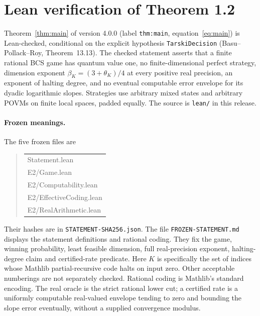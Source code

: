 \section{Lean verification of Theorem 1.2}\label{sec:lean}
Theorem~\ref{thm:main} of version 4.0.0 (label \texttt{thm:main}, equation~\eqref{eq:main}) is Lean-checked, conditional on the explicit hypothesis \texttt{TarskiDecision} (Basu--Pollack--Roy, Theorem~13.13). The checked statement asserts that a finite rational BCS game has quantum value one, no finite-dimensional perfect strategy, dimension exponent $\beta_K=(3+\theta_K)/4$ at every positive real precision, an exponent of halting degree, and no eventual computable error envelope for its dyadic logarithmic slopes. Strategies use arbitrary mixed states and arbitrary POVMs on finite local spaces, padded equally. The source is \texttt{lean/} in this release.

\paragraph{Frozen meanings.}
The five frozen files are
\begin{quote}\ttfamily
\begin{tabular}{@{}l@{}}
Statement.lean\\
E2/Game.lean\\
E2/Computability.lean\\
E2/EffectiveCoding.lean\\
E2/RealArithmetic.lean
\end{tabular}
\end{quote}
Their hashes are in \texttt{STATEMENT-SHA256.json}. The file \texttt{FROZEN-STATEMENT.md} displays the statement definitions and rational coding. They fix the game, winning probability, least feasible dimension, full real-precision exponent, halting-degree claim and certified-rate predicate. Here $K$ is specifically the set of indices whose Mathlib partial-recursive code halts on input zero. Other acceptable numberings are not separately checked. Rational coding is Mathlib's standard encoding. The real oracle is the strict rational lower cut; a certified rate is a uniformly computable real-valued envelope tending to zero and bounding the slope error eventually, without a supplied convergence modulus.

